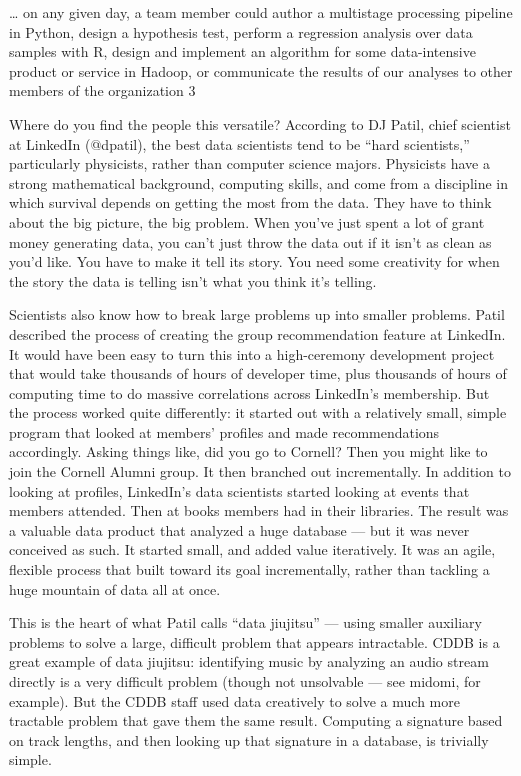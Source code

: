 … on any given day, a team member could author a multistage processing pipeline in Python, design a hypothesis test, perform a regression analysis over data samples with R, design and implement an algorithm for some data-intensive product or service in Hadoop, or communicate the results of our analyses to other members of the organization 3

Where do you find the people this versatile? According to DJ Patil, chief scientist at LinkedIn (@dpatil), the best data scientists tend to be “hard scientists,” particularly physicists, rather than computer science majors. Physicists have a strong mathematical background, computing skills, and come from a discipline in which survival depends on getting the most from the data. They have to think about the big picture, the big problem. When you’ve just spent a lot of grant money generating data, you can’t just throw the data out if it isn’t as clean as you’d like. You have to make it tell its story. You need some creativity for when the story the data is telling isn’t what you think it’s telling.

Scientists also know how to break large problems up into smaller problems. Patil described the process of creating the group recommendation feature at LinkedIn. It would have been easy to turn this into a high-ceremony development project that would take thousands of hours of developer time, plus thousands of hours of computing time to do massive correlations across LinkedIn’s membership. But the process worked quite differently: it started out with a relatively small, simple program that looked at members’ profiles and made recommendations accordingly. Asking things like, did you go to Cornell? Then you might like to join the Cornell Alumni group. It then branched out incrementally. In addition to looking at profiles, LinkedIn’s data scientists started looking at events that members attended. Then at books members had in their libraries. The result was a valuable data product that analyzed a huge database — but it was never conceived as such. It started small, and added value iteratively. It was an agile, flexible process that built toward its goal incrementally, rather than tackling a huge mountain of data all at once.

This is the heart of what Patil calls “data jiujitsu” — using smaller auxiliary problems to solve a large, difficult problem that appears intractable. CDDB is a great example of data jiujitsu: identifying music by analyzing an audio stream directly is a very difficult problem (though not unsolvable — see midomi, for example). But the CDDB staff used data creatively to solve a much more tractable problem that gave them the same result. Computing a signature based on track lengths, and then looking up that signature in a database, is trivially simple.

